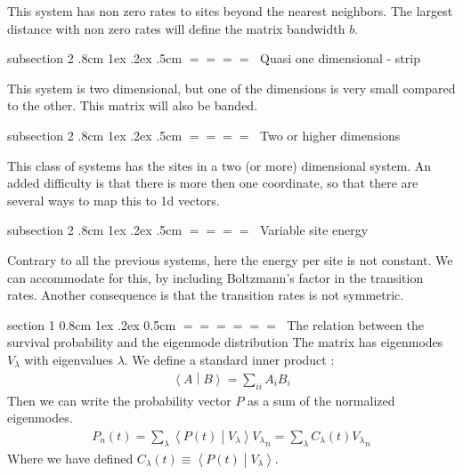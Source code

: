 \documentclass[onecolumn,fleqn,notitlepage,secnumarabic]{revtex4}
\makeatletter
\newcommand{\inner}[2]{\left \langle #1 \middle| #2\right\rangle} %
\def\section{%
  \@startsection
    {section}%
    {1}%
    {\z@}%
    {0.8cm \@plus1ex \@minus .2ex}%
    {0.5cm}%
    {\Large\bf $=\!=\!=\!=\!=\!=\;$}%
}%
\def\subsection{%
  \@startsection
    {subsection}%
    {2}%
    {\z@}%
    {.8cm \@plus1ex \@minus .2ex}%
    {.5cm}%
    {\normalfont\small\bfseries$=\!=\!=\!=\;$}%
}%
\makeatother
\begin{document}
This system has non zero rates to sites beyond the nearest neighbors. The largest distance with non zero rates will define the matrix bandwidth $b$.

\subsection{Quasi one dimensional - strip}

This system is two dimensional, but one of the dimensions is very small compared to the other. This matrix will also be banded.

\subsection{Two or higher dimensions}

This class of systems has the sites in a two (or more) dimensional system. An added difficulty is that there is more then one coordinate, so that there are several ways to map this to 1d vectors.

\subsection{Variable site energy}

Contrary to all the previous systems, here the energy per site is not constant. We can \cite{Ambegaokar:1971} accommodate for this, by including Boltzmann's factor in the transition rates. Another consequence is that the transition rates is not symmetric.

\section{The relation between the survival probability and the eigenmode distribution}
The matrix has eigenmodes $V_\lambda$ with eigenvalues $\lambda$. 
We define a standard inner product :
\begin{align}
\inner{A}{B} = \sum_{ii} A_iB_i
\end{align}
Then we can write the probability vector $P$ as a sum of the normalized eigenmodes.
\begin{align}
P_n(t) = \sum_\lambda \inner{P(t)}{V_\lambda}{V_\lambda }_n = \sum_\lambda C_\lambda(t) {V_\lambda}_n
\end{align}
Where we have defined $C_\lambda(t)\equiv \inner{P(t)}{V_\lambda}$.
\end{document}

